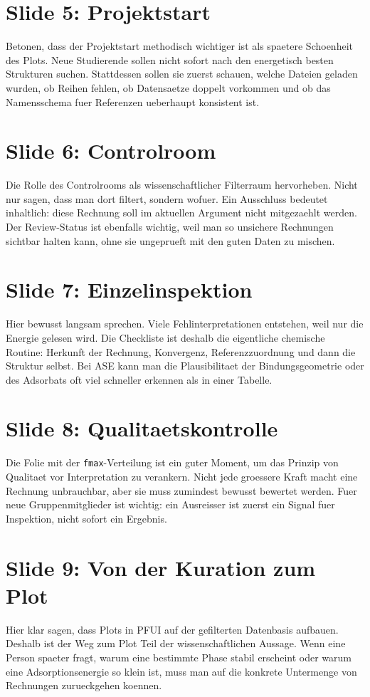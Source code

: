 \documentclass[11pt,a4paper]{article}
\begin{document}
\section*{Slide 5: Projektstart}
Betonen, dass der Projektstart methodisch wichtiger ist als spaetere Schoenheit des Plots. Neue Studierende sollen nicht sofort nach den energetisch besten Strukturen suchen. Stattdessen sollen sie zuerst schauen, welche Dateien geladen wurden, ob Reihen fehlen, ob Datensaetze doppelt vorkommen und ob das Namensschema fuer Referenzen ueberhaupt konsistent ist.

\section*{Slide 6: Controlroom}
Die Rolle des Controlrooms als wissenschaftlicher Filterraum hervorheben. Nicht nur sagen, dass man dort filtert, sondern wofuer. Ein Ausschluss bedeutet inhaltlich: diese Rechnung soll im aktuellen Argument nicht mitgezaehlt werden. Der Review-Status ist ebenfalls wichtig, weil man so unsichere Rechnungen sichtbar halten kann, ohne sie ungeprueft mit den guten Daten zu mischen.

\section*{Slide 7: Einzelinspektion}
Hier bewusst langsam sprechen. Viele Fehlinterpretationen entstehen, weil nur die Energie gelesen wird. Die Checkliste ist deshalb die eigentliche chemische Routine: Herkunft der Rechnung, Konvergenz, Referenzzuordnung und dann die Struktur selbst. Bei ASE kann man die Plausibilitaet der Bindungsgeometrie oder des Adsorbats oft viel schneller erkennen als in einer Tabelle.

\section*{Slide 8: Qualitaetskontrolle}
Die Folie mit der \texttt{fmax}-Verteilung ist ein guter Moment, um das Prinzip von Qualitaet vor Interpretation zu verankern. Nicht jede groessere Kraft macht eine Rechnung unbrauchbar, aber sie muss zumindest bewusst bewertet werden. Fuer neue Gruppenmitglieder ist wichtig: ein Ausreisser ist zuerst ein Signal fuer Inspektion, nicht sofort ein Ergebnis.

\section*{Slide 9: Von der Kuration zum Plot}
Hier klar sagen, dass Plots in PFUI auf der gefilterten Datenbasis aufbauen. Deshalb ist der Weg zum Plot Teil der wissenschaftlichen Aussage. Wenn eine Person spaeter fragt, warum eine bestimmte Phase stabil erscheint oder warum eine Adsorptionsenergie so klein ist, muss man auf die konkrete Untermenge von Rechnungen zurueckgehen koennen.
\end{document}

